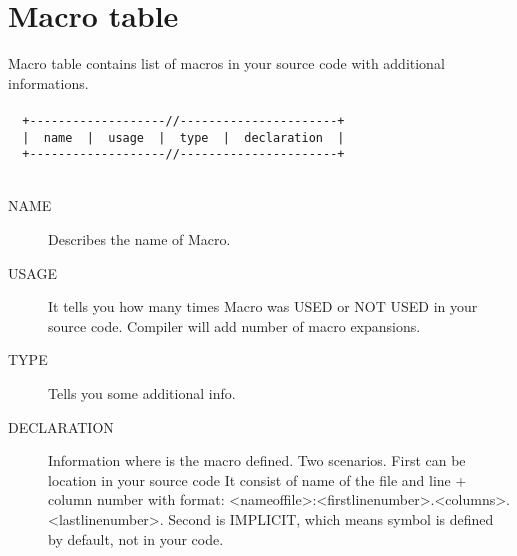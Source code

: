         \section{Macro table}
            Macro table contains list of macros in your source code with additional informations.
            {
                ~\\
                \usecodefont\\
                \verb'  +-------------------//----------------------+'\\
                \verb'  |  name  |  usage  |  type  |  declaration  |'\\
                \verb'  +-------------------//----------------------+'\\
            }\\
            \begin{description}
             \item[NAME] Describes the name of Macro.
             \item[USAGE] It tells you how many times Macro was USED or NOT USED in your source code. Compiler will add number of macro expansions.
             \item[TYPE] Tells you some additional info.
             \item[DECLARATION] Information where is the macro defined. Two scenarios. First can be location in your source code
             It consist of name of the file and line + column number with format: <nameoffile>:<firstlinenumber>.<columns>.<lastlinenumber>.
             Second is IMPLICIT, which means symbol is defined by default, not in your code.
            \end{description}
            
